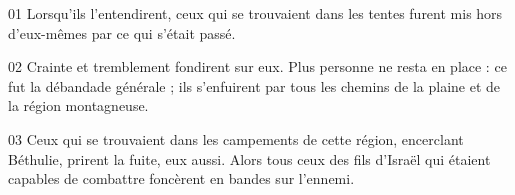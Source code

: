 01 Lorsqu'ils l’entendirent, ceux qui se trouvaient dans les tentes furent mis hors d'eux-mêmes par ce qui s'était passé.

02 Crainte et tremblement fondirent sur eux. Plus personne ne resta en place : ce fut la débandade générale ; ils s'enfuirent par tous les chemins de la plaine et de la région montagneuse.

03 Ceux qui se trouvaient dans les campements de cette région, encerclant Béthulie, prirent la fuite, eux aussi. Alors tous ceux des fils d'Israël qui étaient capables de combattre foncèrent en bandes sur l'ennemi.
